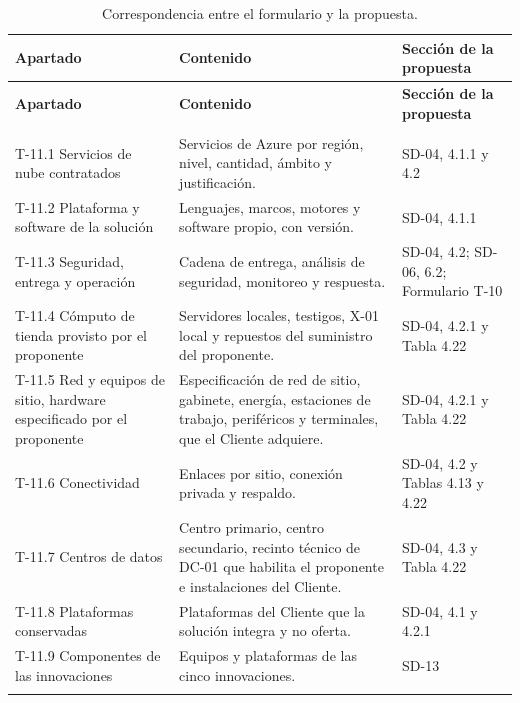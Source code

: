 \documentclass[11pt]{article}
\begin{document}
\begin{longtable}[]{@{}
  >{\raggedright\arraybackslash}p{}
  >{\raggedright\arraybackslash}p{}
  >{\raggedright\arraybackslash}p{}@{}}
\caption{Correspondencia entre el formulario y la propuesta.}\label{tab:t11-1}\\
\toprule\noalign{}
\textbf{Apartado} & \textbf{Contenido} & \textbf{Sección de la propuesta} \\
\midrule\noalign{}
\endfirsthead
\toprule\noalign{}
\textbf{Apartado} & \textbf{Contenido} & \textbf{Sección de la propuesta} \\
\midrule\noalign{}
\endhead
\bottomrule\noalign{}
\multicolumn{3}{@{}p{\columnwidth}@{}}{\rule{0pt}{3.2ex}\textbf{Fuente:} Elaboración propia.} \\
\endlastfoot
T-11.1 Servicios de nube contratados & Servicios de Azure por región, nivel, cantidad, ámbito y justificación. & SD-04, 4.1.1 y 4.2 \\ \addlinespace
T-11.2 Plataforma y software de la solución & Lenguajes, marcos, motores y software propio, con versión. & SD-04, 4.1.1 \\ \addlinespace
T-11.3 Seguridad, entrega y operación & Cadena de entrega, análisis de seguridad, monitoreo y respuesta. & SD-04, 4.2; SD-06, 6.2; Formulario T-10 \\ \addlinespace
T-11.4 Cómputo de tienda provisto por el proponente & Servidores locales, testigos, X-01 local y repuestos del suministro del proponente. & SD-04, 4.2.1 y Tabla 4.22 \\ \addlinespace
T-11.5 Red y equipos de sitio, hardware especificado por el proponente & Especificación de red de sitio, gabinete, energía, estaciones de trabajo, periféricos y terminales, que el Cliente adquiere. & SD-04, 4.2.1 y Tabla 4.22 \\ \addlinespace
T-11.6 Conectividad & Enlaces por sitio, conexión privada y respaldo. & SD-04, 4.2 y Tablas 4.13 y 4.22 \\ \addlinespace
T-11.7 Centros de datos & Centro primario, centro secundario, recinto técnico de DC-01 que habilita el proponente e instalaciones del Cliente. & SD-04, 4.3 y Tabla 4.22 \\ \addlinespace
T-11.8 Plataformas conservadas & Plataformas del Cliente que la solución integra y no oferta. & SD-04, 4.1 y 4.2.1 \\ \addlinespace
T-11.9 Componentes de las innovaciones & Equipos y plataformas de las cinco innovaciones. & SD-13 \\ \addlinespace

\end{longtable}
\end{document}
